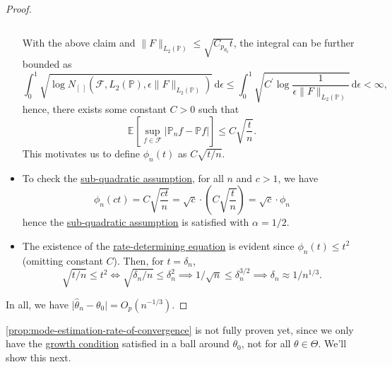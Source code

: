 \begin{proof}
\begin{itemize}
\begin{claim}
\[			      \]
		      \end{claim}
		      With the above claim and \(\lVert F \rVert _{L_2(\mathbb{P} )} \leq \sqrt{C_{p_{\theta _0}} t} \), the integral can be further bounded as
		      \[
			      \int_{0}^{1} \sqrt{\log N_{[\ ]}(\mathscr{F} , L_2(\mathbb{P} ), \epsilon \lVert F \rVert _{L_2(\mathbb{P} )})} \,\mathrm{d}\epsilon
			      \leq \int_{0}^{1} \sqrt{C^{\prime} \log \frac{1}{\epsilon \lVert F \rVert _{L_2(\mathbb{P} )}} } \,\mathrm{d}\epsilon
			      < \infty,
		      \]
		      hence, there exists some constant \(C> 0\) such that
		      \[
			      \mathbb{E}_{}\left[\sup _{f\in \mathscr{F} } \vert \mathbb{P} _n f - \mathbb{P} f \vert  \right]
			      \leq C \sqrt{\frac{t}{n}}.
		      \]
		      This motivates us to define \(\phi _n (t)\) as \(C \sqrt{t / n} \).
		\item To check the \hyperref[def:sub-quadratic-assumption]{sub-quadratic assumption}, for all \(n\) and \(c > 1\), we have
		      \[
			      \phi _n (ct)
			      = C \sqrt{\frac{ct}{n}}
			      = \sqrt{c} \cdot \left( C \sqrt{\frac{t}{n}} \right)
			      = \sqrt{c} \cdot \phi _n
		      \]
		      hence the \hyperref[def:sub-quadratic-assumption]{sub-quadratic assumption} is satisfied with \(\alpha = 1 / 2\).
		\item The existence of the \hyperref[def:rate-determining-equation]{rate-determining equation} is evident since \(\phi _n(t) \leq t^2\) (omitting constant \(C\)). Then, for \(t = \delta _n\),
		      \[
			      \sqrt{t / n} \leq t^2
			      \iff \sqrt{\delta _n / n} \leq \delta _n^2
			      \implies 1 / \sqrt{n} \leq \delta _n^{3 / 2}
			      \implies \delta _n \approx 1 / n^{1 / 3}.
		      \]
	\end{itemize}
	In all, we have \(\vert \hat{\theta} _n - \theta _0 \vert = O_p(n^{-1 / 3})\).
\end{proof}

\autoref{prop:mode-estimation-rate-of-convergence} is not fully proven yet, since we only have the \hyperref[def:growth-condition*]{growth condition} satisfied in a ball around \(\theta _0\), not for all \(\theta \in \Theta \). We'll show this next.
